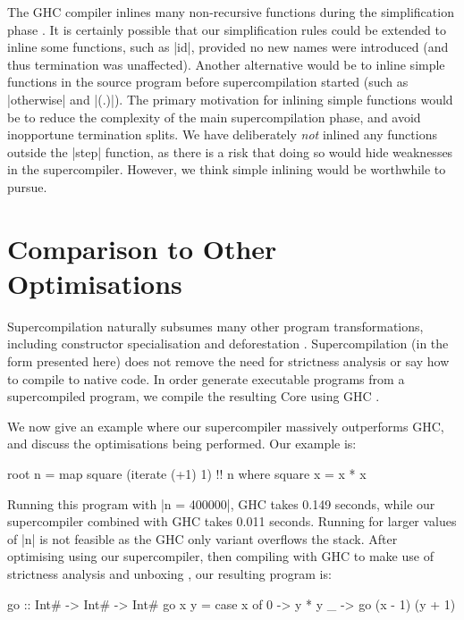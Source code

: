 \documentclass[draft]{sigplanconf}
\begin{document}
The GHC compiler inlines many non-recursive functions during the simplification phase \cite{spj:inlining}. It is certainly possible that our simplification rules could be extended to inline some functions, such as |id|, provided no new names were introduced (and thus termination was unaffected). Another alternative would be to inline simple functions in the source program before supercompilation started (such as |otherwise| and |(.)|). The primary motivation for inlining simple functions would be to reduce the complexity of the main supercompilation phase, and avoid inopportune termination splits. We have deliberately \textit{not} inlined any functions outside the |step| function, as there is a risk that doing so would hide weaknesses in the supercompiler. However, we think simple inlining would be worthwhile to pursue.

\section{Comparison to Other Optimisations}
\label{sec:examples}

Supercompilation naturally subsumes many other program transformations, including constructor specialisation \cite{spj:specconstr} and deforestation \cite{gill:shortcut_deforestation,wadler:deforestation}. Supercompilation (in the form presented here) does not remove the need for strictness analysis or say how to compile to native code. In order generate executable programs from a supercompiled program, we compile the resulting Core using GHC \cite{ghc6_12}.

We now give an example where our supercompiler massively outperforms GHC, and discuss the optimisations being performed. Our example is:

\begin{code}
root n = map square (iterate (+1) 1) !! n
    where square x = x * x
\end{code}

Running this program with |n = 400000|, GHC takes 0.149 seconds, while our supercompiler combined with GHC takes 0.011 seconds. Running for larger values of |n| is not feasible as the GHC only variant overflows the stack. After optimising using our supercompiler, then compiling with GHC to make use of strictness analysis and unboxing \cite{spj:unboxing}, our resulting program is:

\begin{code}
go :: Int# -> Int# -> Int#
go x y = case x of
    0 -> y * y
    _ -> go (x - 1) (y + 1)
\end{code}
\end{document}
